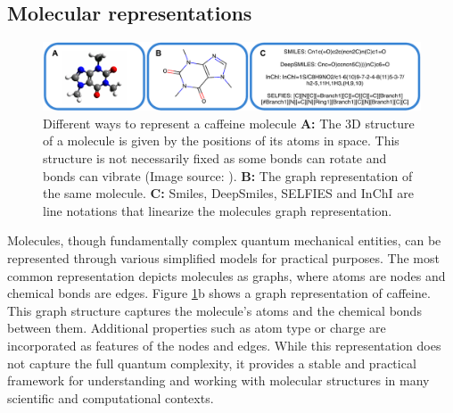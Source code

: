 \subsection{Molecular representations}
\begin{figure}
      \centering
      \includegraphics[width=\textwidth]{figures/representations/representations.pdf}
      \caption{Different ways to represent a caffeine molecule \textbf{A:}  The 3D structure of a
            molecule is given by the positions of its atoms in space. This structure is not
            necessarily fixed as some bonds can rotate and bonds can vibrate (Image source:
            \citep{Caffeine3DStructure2010}). \textbf{B:} The graph representation of the same
            molecule. \textbf{C:} Smiles, DeepSmiles, SELFIES and InChI are line notations that
            linearize the molecules graph representation.\label{fig:molecular-graph}}
\end{figure}
Molecules, though fundamentally complex quantum mechanical entities, can be represented through
various simplified models for practical purposes. The most common representation depicts molecules
as graphs, where atoms are nodes and chemical bonds are edges. Figure \ref{fig:molecular-graph}b
shows a graph representation of caffeine. This graph structure captures the molecule's atoms
and the chemical bonds between them. Additional properties such as atom type or charge are
incorporated as features of the nodes and edges. While this representation does not capture the full
quantum complexity, it provides a stable and practical framework for understanding and working with
molecular structures in many scientific and computational contexts.

